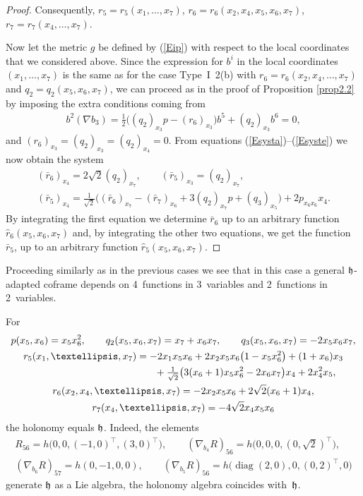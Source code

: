 \documentclass[11pt]{article}
\numberwithin{equation}{section}
\newcommand\fh{{\frak h}}
\newcommand{\diag}{\operatorname{diag}}
\begin{document}
\begin{proof}
Consequently, $r_5=r_5(x_1,\dots,x_7)$, $r_6=r_6(x_2, x_4, x_5, x_6, x_7)$, $r_7=r_7(x_4,\dots,x_7)$.

Now let the metric $g$ be defined by (\ref{Eip}) with respect to the local coordinates that we considered above. Since the expression for $b^i$ in the local coordinates $(x_1, \ldots, x_7)$ is the same as for the case Type~I~2(b) with $r_6 = r_6 (x_2, x_4, \ldots, x_7)$ and $q_2 = q_2(x_5,x_6,x_7)$, we can proceed as in the proof of Proposition \ref{prop2.2} by imposing the extra conditions coming from \begin{gather*}b^2 (\nabla b_3) = \tfrac{1}{2} \big( (q_2)_{x_3} p - (r_6)_{x_3} \big) b^5 + (q_2)_{x_3} b^6 =0,\end{gather*} and $ (r_6)_{x_3} =(q_2)_{x_3} = (q_2)_{x_4} =0$. From equations (\ref{Esysta})--(\ref{Esyste}) we now obtain the system
\begin{gather*}
(\bar r_6)_{x_4}=2\sqrt 2(q_2)_{x_7}, \qquad
(\bar r_5)_{x_3} = (q_2)_{x_7}, \\
(\bar r_5)_{x_4}=\tfrac 1{\sqrt2}\big((\bar r_6)_{x_7} - (\bar r_7)_{x_6} +3 (q_2)_{x_7}p +(q_3)_{x_5}\big) +2p_{x_6 x_6} x_4.
\end{gather*}
By integrating the first equation we determine $\bar r_6$ up to an arbitrary function $\hat r_6(x_5, x_6,x_7)$ and, by integrating the other two equations, we get the function $\bar r_5$, up to an arbitrary function $\hat r_5(x_5, x_6,x_7)$.
 \end{proof}

\begin{Remark} Proceeding similarly as in the previous cases we see that in this case a general $\fh$-adapted coframe depends on 4~functions in 3~variables and 2~functions in 2~variables.
\end{Remark}
\begin{Example} For \begin{gather*}
p(x_5,x_6)= x_5 x_6^2, \qquad
q_2(x_5,x_6, x_7) = x_7+x_6 x_7,\qquad
q_3(x_5,x_6,x_7) = -2 x_5 x_6 x_7 ,\\
r_5(x_1,\dots, x_7) = -2x_1 x_5 x_6 +2 x_2 x_5 x_6 \big(1- x_5x_6^2\big) + (1 + x_6) x_3 \\
\hphantom{r_5(x_1,\dots, x_7) =}{} + \tfrac1{\sqrt2}\big(3 ( x_6 +1) x_5 x_6^2 - 2 x_6 x_7 \big) x_4 + 2 x_4^2 x_5,\\
r_6(x_2, x_4, \dots, x_7) = -2x_2 x_5 x_6 + 2 \sqrt{2}(x_6 + 1) x_4,\\
r_7(x_4,\dots, x_7) = -4\sqrt 2 x_4 x_5 x_6
\end{gather*}
the holonomy equals $\frak h$. Indeed, the elements
\begin{gather*}
R_{56}=h\big(0,0, (-1,0)^\top,(3,0)^\top\big),\qquad (\nabla_{b_4} R)_{56}= h\big(0,0,0,(0,\sqrt{2})^\top\big),\\
(\nabla_{b_6} R)_{57}= h(0,-1,0,0), \qquad (\nabla_{b_5} R)_{56}= h\big(\diag(2,0),0,(0,2)^\top,0\big)
\end{gather*}
 generate $\fh$ as a Lie algebra, the holonomy algebra coincides with~$\fh$.
\end{Example}
\end{document}
